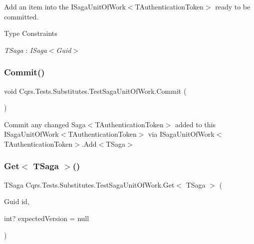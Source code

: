 Add an item into the I\+Saga\+Unit\+Of\+Work$<$\+T\+Authentication\+Token$>$ ready to be committed. 

\begin{Desc}
\item[Type Constraints]\begin{description}
\item[{\em T\+Saga} : {\em I\+Saga$<$Guid$>$}]\end{description}
\end{Desc}
\mbox{\label{classCqrs_1_1Tests_1_1Substitutes_1_1TestSagaUnitOfWork_ab50323c2f6a97c5f7eefa0d718dd7053_ab50323c2f6a97c5f7eefa0d718dd7053}} 
\subsubsection{\texorpdfstring{Commit()}{Commit()}}
{\footnotesize\ttfamily void Cqrs.\+Tests.\+Substitutes.\+Test\+Saga\+Unit\+Of\+Work.\+Commit (\begin{DoxyParamCaption}{ }\end{DoxyParamCaption})}



Commit any changed Saga$<$\+T\+Authentication\+Token$>$ added to this I\+Saga\+Unit\+Of\+Work$<$\+T\+Authentication\+Token$>$ via I\+Saga\+Unit\+Of\+Work$<$\+T\+Authentication\+Token$>$.\+Add$<$\+T\+Saga$>$ 

\mbox{\label{classCqrs_1_1Tests_1_1Substitutes_1_1TestSagaUnitOfWork_a5b301e0f8efa469bcd164f032fffad98_a5b301e0f8efa469bcd164f032fffad98}} 
\subsubsection{\texorpdfstring{Get$<$ T\+Saga $>$()}{Get< TSaga >()}}
{\footnotesize\ttfamily T\+Saga Cqrs.\+Tests.\+Substitutes.\+Test\+Saga\+Unit\+Of\+Work.\+Get$<$ T\+Saga $>$ (\begin{DoxyParamCaption}\item[{Guid}]{id,  }\item[{int?}]{expected\+Version = {\ttfamily null} }\end{DoxyParamCaption})}




